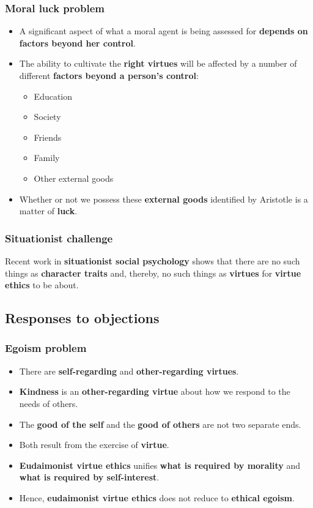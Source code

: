 \documentclass[11pt]{article}
\begin{document}
\subsubsection{Moral luck problem}
\label{sec:org357fd74}
\begin{itemize}
\item A significant aspect of what a moral agent is being assessed for \textbf{depends on factors beyond her control}.
\item The ability to cultivate the \textbf{right virtues} will be affected by a number of different \textbf{factors beyond a person's control}:
\begin{itemize}
\item Education
\item Society
\item Friends
\item Family
\item Other external goods
\end{itemize}
\item Whether or not we possess these \textbf{external goods} identified by Aristotle is a matter of \textbf{luck}.
\end{itemize}
\subsubsection{Situationist challenge}
\label{sec:org594871a}
Recent work in \textbf{situationist social psychology} shows that there are no such things as \textbf{character traits} and, thereby, no such things as \textbf{virtues} for \textbf{virtue ethics} to be about.
\subsection{Responses to objections}
\label{sec:orgb6f0c5f}

\subsubsection{Egoism problem}
\label{sec:org53f65e5}
\begin{itemize}
\item There are \textbf{self-regarding} and \textbf{other-regarding virtues}.
\item \textbf{Kindness} is an \textbf{other-regarding virtue} about how we respond to the needs of others.
\item The \textbf{good of the self} and the \textbf{good of others} are not two separate ends.
\item Both result from the exercise of \textbf{virtue}.
\item \textbf{Eudaimonist virtue ethics} unifies \textbf{what is required by morality} and \textbf{what is required by self-interest}.
\item Hence, \textbf{eudaimonist virtue ethics} does not reduce to \textbf{ethical egoism}.
\end{itemize}
\end{document}
